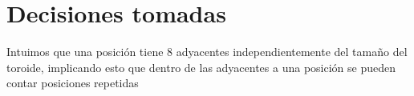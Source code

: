 \documentclass[a4paper]{article}
\begin{document}



\section{Decisiones tomadas}
Intuimos que una posición tiene 8 adyacentes independientemente del tamaño del toroide, 
implicando esto que dentro de las adyacentes a una posición se pueden contar posiciones repetidas
\end{document}

